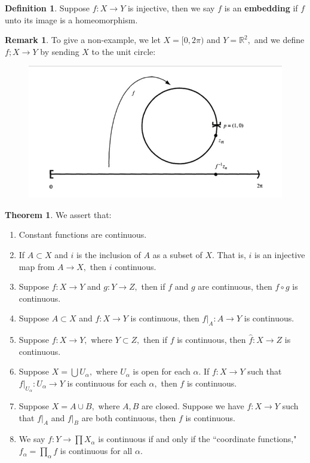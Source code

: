 \documentclass[10pt, oneside]{article}
\newcommand{\bbR}{\mathbb{R}}
\theoremstyle{definition}
\newtheorem{thm}{Theorem}
\newtheorem{defn}{Definition}
\newtheorem{rem}{Remark}
\begin{document}
\begin{defn}
    Suppose $f: X\to Y$ is injective, then we say $f$ is an \textbf{embedding} if $f$ unto its image is a homeomorphism.
\end{defn}
\begin{rem}
    To give a non-example, we let $X = [0,2\pi)$ and $Y = \bbR^2,$ and we define 
    $f; X\to Y$ by sending $X$ to the unit circle: 
    \begin{figure}[H]
        \centering
        \includegraphics[width=0.5\linewidth]{Images/Pughnonexample.png}
    \end{figure}
\end{rem}
\begin{thm}
    We assert that:
    \begin{enumerate}
        \item Constant functions are continuous.
        \item If $A \subset X$ and $i$ is the inclusion of $A$ as a subset of $X.$ That is, $i$ is an injective map from $A \to X,$ then $i$ continuous. 
        \item Suppose $f: X\to Y$ and $g: Y\to Z,$ then if $f$ and $g$ are continuous, then $f \circ g$ is continuous.
        \item Suppose $A\subset X$ and $f: X\to Y$ is continuous, then $f|_A: A \to Y$ is continuous.
        \item Suppose $f: X\to Y,$ where $Y\subset Z,$ then if $f$ is continuous, then $\hat{f}: X\to Z$ is continuous.
        \item Suppose $X= \bigcup U_\alpha,$ where $U_\alpha$ is open for each $\alpha.$ If $f: X\to Y$ such that $f|_{U_\alpha}: U_\alpha \to Y$ is continuous for each $\alpha,$ then $f$ is continuous.
        \item Suppose $X = A \cup B,$ where $A,B$ are closed. Suppose we have  $f: X\to Y$ such that $f|_A$ and $f|_B$ are both continuous, then $f$ is continuous.
        \item We say $f: Y \to \prod X_\alpha$ is continuous if and only if the ``coordinate functions," $f_\alpha = \prod_\alpha f$ is continuous for all $\alpha.$
    \end{enumerate}
\end{thm}
\end{document}
